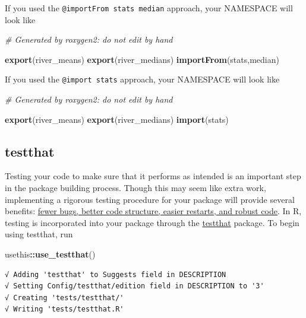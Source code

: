 \documentclass[
]{book}
\newenvironment{Shaded}{\begin{snugshade}}{\end{snugshade}}
\newcommand{\CommentTok}[1]{\textcolor[rgb]{0.56,0.35,0.01}{\textit{#1}}}
\newcommand{\KeywordTok}[1]{\textcolor[rgb]{0.13,0.29,0.53}{\textbf{#1}}}
\newcommand{\NormalTok}[1]{#1}
\newcommand{\OperatorTok}[1]{\textcolor[rgb]{0.81,0.36,0.00}{\textbf{#1}}}
\begin{document}
If you used the \texttt{@importFrom\ stats\ median} approach, your NAMESPACE will look like

\begin{Shaded}
\begin{Highlighting}[]
\CommentTok{# Generated by roxygen2: do not edit by hand}

\KeywordTok{export}\NormalTok{(river_means)}
\KeywordTok{export}\NormalTok{(river_medians)}
\KeywordTok{importFrom}\NormalTok{(stats,median)}
\end{Highlighting}
\end{Shaded}

If you used the \texttt{@import\ stats} approach, your NAMESPACE will look like

\begin{Shaded}
\begin{Highlighting}[]
\CommentTok{# Generated by roxygen2: do not edit by hand}

\KeywordTok{export}\NormalTok{(river_means)}
\KeywordTok{export}\NormalTok{(river_medians)}
\KeywordTok{import}\NormalTok{(stats)}
\end{Highlighting}
\end{Shaded}

\hypertarget{testthat}{%
\subsection{testthat}\label{testthat}}

Testing your code to make sure that it performs as intended is an important step in the package building process. Though this may seem like extra work, implementing a rigorous testing procedure for your package will provide several benefits: \href{https://r-pkgs.org/tests.html}{fewer bugs, better code structure, easier restarts, and robust code}. In R, testing is incorporated into your package through the \href{https://testthat.r-lib.org/}{testthat} package. To begin using testthat, run

\begin{Shaded}
\begin{Highlighting}[]
\NormalTok{usethis}\OperatorTok{::}\KeywordTok{use_testthat}\NormalTok{()}
\end{Highlighting}
\end{Shaded}

\begin{verbatim}
√ Adding 'testthat' to Suggests field in DESCRIPTION
√ Setting Config/testthat/edition field in DESCRIPTION to '3'
√ Creating 'tests/testthat/'
√ Writing 'tests/testthat.R'
\end{verbatim}
\end{document}
